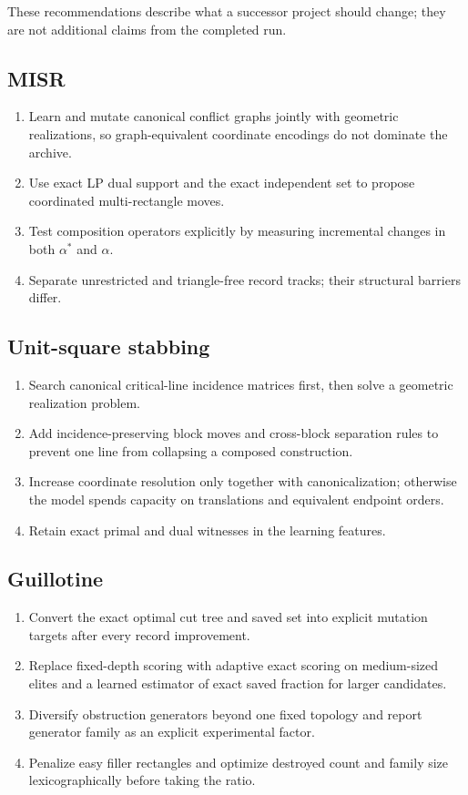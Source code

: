 \documentclass[11pt]{article}
\begin{document}
These recommendations describe what a successor project should change; they
are not additional claims from the completed run.

\subsection{MISR}

\begin{enumerate}
\item Learn and mutate canonical conflict graphs jointly with geometric
realizations, so graph-equivalent coordinate encodings do not dominate the
archive.
\item Use exact LP dual support and the exact independent set to propose
coordinated multi-rectangle moves.
\item Test composition operators explicitly by measuring incremental changes
in both $\alpha^*$ and $\alpha$.
\item Separate unrestricted and triangle-free record tracks; their structural
barriers differ.
\end{enumerate}

\subsection{Unit-square stabbing}

\begin{enumerate}
\item Search canonical critical-line incidence matrices first, then solve a
geometric realization problem.
\item Add incidence-preserving block moves and cross-block separation rules to
prevent one line from collapsing a composed construction.
\item Increase coordinate resolution only together with canonicalization;
otherwise the model spends capacity on translations and equivalent endpoint
orders.
\item Retain exact primal and dual witnesses in the learning features.
\end{enumerate}

\subsection{Guillotine}

\begin{enumerate}
\item Convert the exact optimal cut tree and saved set into explicit mutation
targets after every record improvement.
\item Replace fixed-depth scoring with adaptive exact scoring on medium-sized
elites and a learned estimator of exact saved fraction for larger candidates.
\item Diversify obstruction generators beyond one fixed topology and report
generator family as an explicit experimental factor.
\item Penalize easy filler rectangles and optimize destroyed count and family
size lexicographically before taking the ratio.
\end{enumerate}
\end{document}
